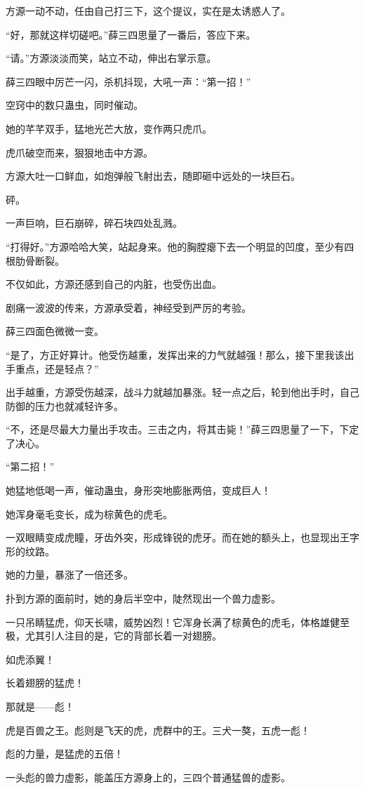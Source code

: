 \begin{this_body}
方源一动不动，任由自己打三下，这个提议，实在是太诱惑人了。

“好，那就这样切磋吧。”薛三四思量了一番后，答应下来。

“请。”方源淡淡而笑，站立不动，伸出右掌示意。

薛三四眼中厉芒一闪，杀机抖现，大吼一声：“第一招！”

空窍中的数只蛊虫，同时催动。

她的芊芊双手，猛地光芒大放，变作两只虎爪。

虎爪破空而来，狠狠地击中方源。

方源大吐一口鲜血，如炮弹般飞射出去，随即砸中远处的一块巨石。

砰。

一声巨响，巨石崩碎，碎石块四处乱溅。

“打得好。”方源哈哈大笑，站起身来。他的胸膛瘪下去一个明显的凹度，至少有四根肋骨断裂。

不仅如此，方源还感到自己的内脏，也受伤出血。

剧痛一波波的传来，方源承受着，神经受到严厉的考验。

薛三四面色微微一变。

“是了，方正好算计。他受伤越重，发挥出来的力气就越强！那么，接下里我该出手重点，还是轻点？”

出手越重，方源受伤越深，战斗力就越加暴涨。轻一点之后，轮到他出手时，自己防御的压力也就减轻许多。

“不，还是尽最大力量出手攻击。三击之内，将其击毙！”薛三四思量了一下，下定了决心。

“第二招！”

她猛地低喝一声，催动蛊虫，身形突地膨胀两倍，变成巨人！

她浑身毫毛变长，成为棕黄色的虎毛。

一双眼睛变成虎瞳，牙齿外突，形成锋锐的虎牙。而在她的额头上，也显现出王字形的纹路。

她的力量，暴涨了一倍还多。

扑到方源的面前时，她的身后半空中，陡然现出一个兽力虚影。

一只吊睛猛虎，仰天长啸，威势凶烈！它浑身长满了棕黄色的虎毛，体格雄健至极，尤其引人注目的是，它的背部长着一对翅膀。

如虎添翼！

长着翅膀的猛虎！

那就是——彪！

虎是百兽之王。彪则是飞天的虎，虎群中的王。三犬一獒，五虎一彪！

彪的力量，是猛虎的五倍！

一头彪的兽力虚影，能盖压方源身上的，三四个普通猛兽的虚影。


\end{this_body}
